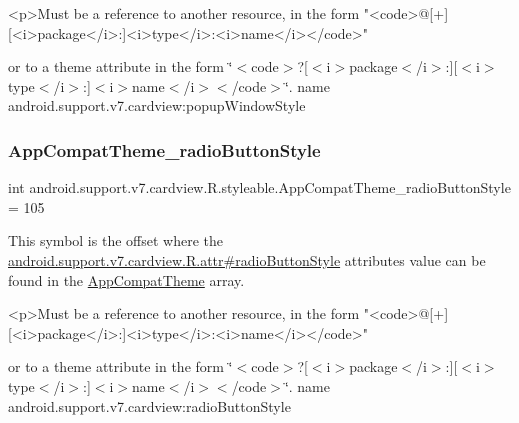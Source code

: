 \begin{DoxyVerb}      <p>Must be a reference to another resource, in the form "<code>@[+][<i>package</i>:]<i>type</i>:<i>name</i></code>"
\end{DoxyVerb}
 or to a theme attribute in the form \char`\"{}$<$code$>$?\mbox{[}$<$i$>$package$<$/i$>$\+:\mbox{]}\mbox{[}$<$i$>$type$<$/i$>$\+:\mbox{]}$<$i$>$name$<$/i$>$$<$/code$>$\char`\"{}.  name android.\+support.\+v7.\+cardview\+:popup\+Window\+Style \mbox{\label{classandroid_1_1support_1_1v7_1_1cardview_1_1R_1_1styleable_a7ff022a059deabbb175cc243b5ea6c68}} 
\subsubsection{\texorpdfstring{App\+Compat\+Theme\+\_\+radio\+Button\+Style}{AppCompatTheme\_radioButtonStyle}}
{\footnotesize\ttfamily int android.\+support.\+v7.\+cardview.\+R.\+styleable.\+App\+Compat\+Theme\+\_\+radio\+Button\+Style = 105\hspace{0.3cm}{\ttfamily [static]}}

This symbol is the offset where the \hyperlink{classandroid_1_1support_1_1v7_1_1cardview_1_1R_1_1attr_a0facf965724c5a1991b6e8a0e6de92bb}{android.\+support.\+v7.\+cardview.\+R.\+attr\#radio\+Button\+Style} attribute\textquotesingle{}s value can be found in the \hyperlink{classandroid_1_1support_1_1v7_1_1cardview_1_1R_1_1styleable_a52e6f69f954ecc2622d72c0b4d298938}{App\+Compat\+Theme} array.

\begin{DoxyVerb}      <p>Must be a reference to another resource, in the form "<code>@[+][<i>package</i>:]<i>type</i>:<i>name</i></code>"
\end{DoxyVerb}
 or to a theme attribute in the form \char`\"{}$<$code$>$?\mbox{[}$<$i$>$package$<$/i$>$\+:\mbox{]}\mbox{[}$<$i$>$type$<$/i$>$\+:\mbox{]}$<$i$>$name$<$/i$>$$<$/code$>$\char`\"{}.  name android.\+support.\+v7.\+cardview\+:radio\+Button\+Style \mbox{\label{classandroid_1_1support_1_1v7_1_1cardview_1_1R_1_1styleable_a80912800f5da21eb5d311d314e104c2a}} 
